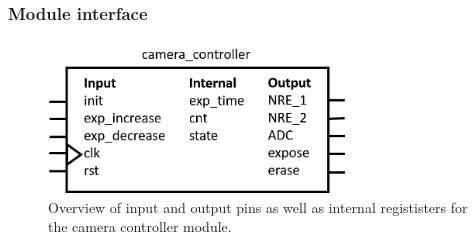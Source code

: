 \subsubsection{Module interface}

\begin{figure}[H]
    \centering
    \includegraphics[width=0.7\textwidth]{graphs/camera_controller_pinout.png}
    \caption{Overview of input and output pins as well as internal regististers for the camera controller module.}
    \label{fig:io}
\end{figure}
